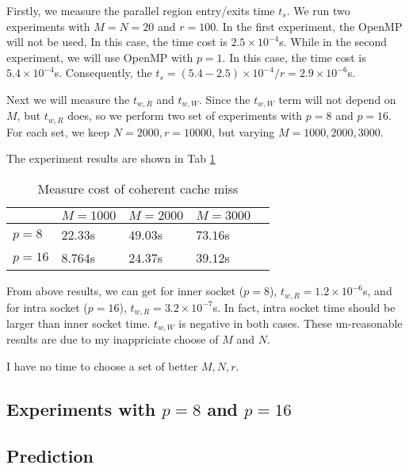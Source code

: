 Firstly, we measure the parallel region entry/exits time $t_s$.
We run two experiments with $M=N=20$ and $r=100$. In the first experiment, the OpenMP will not be used,
In this case, the time cost is $2.5\times 10^{-4}$s.
While in the second experiment, we will use OpenMP with $p=1$.
In this case, the time cost is $5.4\times 10^{-4}$s.
Consequently, the $t_s = (5.4-2.5)\times 10^{-4} / r = 2.9 \times 10^{-6}$s.

Next we will measure the $t_{w,R}$ and $t_{w,W}$. Since the $t_{w,W}$ term will not depend on $M$, but $t_{w,R}$ does,
so we perform two set of experiments with $p=8$ and $p=16$. 
For each set, we keep $N=2000, r=10000$, but varying $M = 1000, 2000, 3000$.

The experiment results are shown in Tab \ref{tab2_1}

\begin{table}[h]
	\centering
	\caption{Measure cost of coherent cache miss}
	\label{tab2_1}
	\begin{tabular}{lllll}
		\hline
		             & $M = 1000$ & $M = 2000$ & $M = 3000$ \\ \hline
		$p=8$            & $22.33$s &  $49.03$s &   $73.16$s \\
		$p=16$           & $8.764$s & $24.37$s & $39.12$s  \\ \hline
	\end{tabular}
\end{table}

From above results, we can get for inner socket ($p=8$), $t_{w,R} = 1.2\times 10^{-6}$s,
and for intra socket ($p=16$), $t_{w,R} = 3.2\times 10^{-7}$s. In fact, intra socket time should be larger than inner socket time. $t_{w,W}$ is negative in both cases. These un-reasonable results are due to my inappriciate choose of $M$ and $N$. 

I have no time to choose a set of better $M,N,r$.

\subsection{Experiments with $p=8$ and $p=16$}

\subsection{Prediction}
